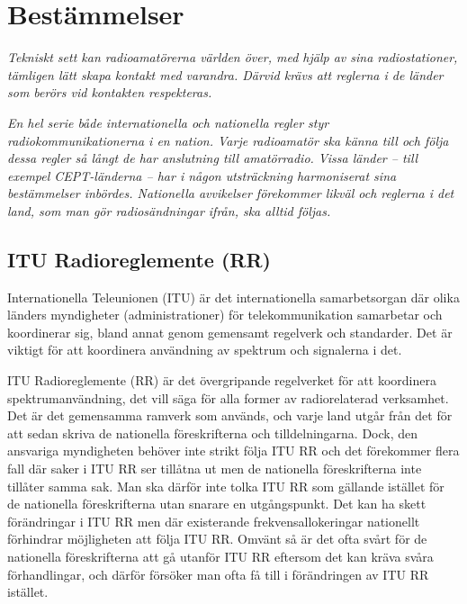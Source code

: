\chapter{Bestämmelser}
\begin{multicols}{2}

\emph{Tekniskt sett kan radioamatörerna världen över, med hjälp av
  sina radiostationer, tämligen lätt skapa kontakt med varandra.
  Därvid krävs att reglerna i de länder som berörs vid kontakten respekteras.}

\emph{En hel serie både internationella och nationella regler styr
  radiokommunikationerna i en nation.
  Varje radioamatör ska känna till och följa dessa regler så långt de har
  anslutning till amatörradio.
  Vissa länder -- till exempel CEPT-länderna -- har i någon utsträckning harmoniserat
  sina bestämmelser inbördes.
  Nationella avvikelser förekommer likväl och reglerna i det land, som man gör
  radiosändningar ifrån, ska alltid följas.}

\section{ITU Radioreglemente (RR)}

Internationella Teleunionen (ITU) är det internationella samarbetsorgan där
olika länders myndigheter (administrationer) för telekommunikation samarbetar
och koordinerar sig, bland annat genom gemensamt regelverk och standarder.
Det är viktigt för att koordinera användning av spektrum och signalerna i det.

ITU Radioreglemente (RR) \cite{ITU-RR} är det övergripande regelverket för att
koordinera spektrumanvändning, det vill säga för alla former av
radiorelaterad verksamhet.
Det är det gemensamma ramverk som används, och varje land utgår från det för att
sedan skriva de nationella föreskrifterna och tilldelningarna.
Dock, den ansvariga myndigheten behöver inte strikt följa ITU RR och det
förekommer flera fall där saker i ITU RR ser tillåtna ut men de nationella
föreskrifterna inte tillåter samma sak.
Man ska därför inte tolka ITU RR som gällande istället för de nationella
föreskrifterna utan snarare en utgångspunkt.
Det kan ha skett förändringar i ITU RR men där existerande frekvensallokeringar
nationellt förhindrar möjligheten att följa ITU RR.
Omvänt så är det ofta svårt för de nationella föreskrifterna att gå utanför
ITU RR eftersom det kan kräva svåra förhandlingar, och därför försöker man ofta
få till i förändringen av ITU RR istället.


\end{multicols}
